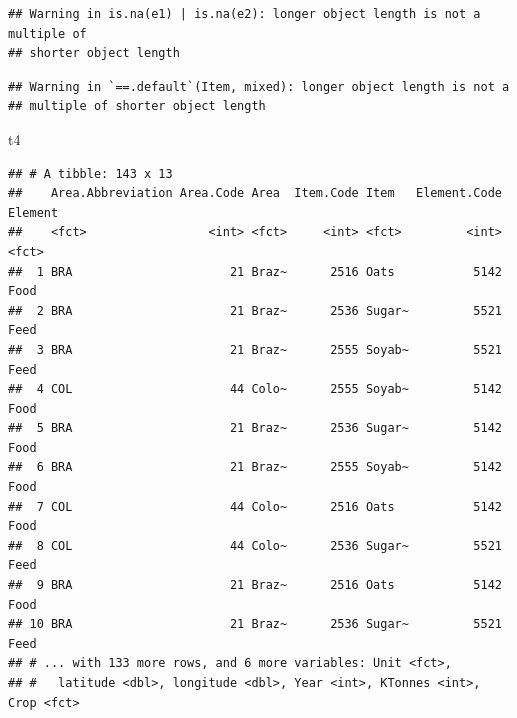 \documentclass[]{article}
\newenvironment{Shaded}{\begin{snugshade}}{\end{snugshade}}
\newcommand{\KeywordTok}[1]{\textcolor[rgb]{0.13,0.29,0.53}{\textbf{{#1}}}}
\newcommand{\DataTypeTok}[1]{\textcolor[rgb]{0.13,0.29,0.53}{{#1}}}
\newcommand{\StringTok}[1]{\textcolor[rgb]{0.31,0.60,0.02}{{#1}}}
\newcommand{\CommentTok}[1]{\textcolor[rgb]{0.56,0.35,0.01}{\textit{{#1}}}}
\newcommand{\NormalTok}[1]{{#1}}
\begin{document}
\begin{verbatim}
## Warning in is.na(e1) | is.na(e2): longer object length is not a multiple of
## shorter object length
\end{verbatim}

\begin{verbatim}
## Warning in `==.default`(Item, mixed): longer object length is not a
## multiple of shorter object length
\end{verbatim}

\begin{Shaded}
\begin{Highlighting}[]
\NormalTok{t4 }
\end{Highlighting}
\end{Shaded}

\begin{verbatim}
## # A tibble: 143 x 13
##    Area.Abbreviation Area.Code Area  Item.Code Item   Element.Code Element
##    <fct>                 <int> <fct>     <int> <fct>         <int> <fct>  
##  1 BRA                      21 Braz~      2516 Oats           5142 Food   
##  2 BRA                      21 Braz~      2536 Sugar~         5521 Feed   
##  3 BRA                      21 Braz~      2555 Soyab~         5521 Feed   
##  4 COL                      44 Colo~      2555 Soyab~         5142 Food   
##  5 BRA                      21 Braz~      2536 Sugar~         5142 Food   
##  6 BRA                      21 Braz~      2555 Soyab~         5142 Food   
##  7 COL                      44 Colo~      2516 Oats           5142 Food   
##  8 COL                      44 Colo~      2536 Sugar~         5521 Feed   
##  9 BRA                      21 Braz~      2516 Oats           5142 Food   
## 10 BRA                      21 Braz~      2536 Sugar~         5521 Feed   
## # ... with 133 more rows, and 6 more variables: Unit <fct>,
## #   latitude <dbl>, longitude <dbl>, Year <int>, KTonnes <int>, Crop <fct>
\end{verbatim}

\begin{Shaded}
\end{Shaded}
\end{document}
